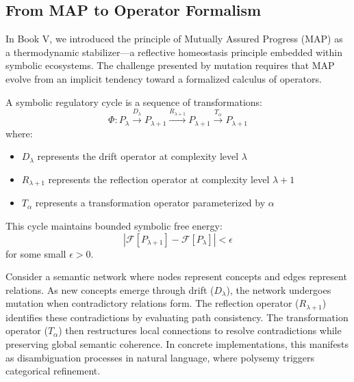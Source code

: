 \subsection{From MAP to Operator Formalism}
\label{subsection:bk6_from_map_to_operator_formalism}
In Book V, we introduced the principle of Mutually Assured Progress (MAP) as a thermodynamic stabilizer—a reflective homeostasis principle embedded within symbolic ecosystems. The challenge presented by mutation requires that MAP evolve from an implicit tendency toward a formalized calculus of operators.
\begin{definition}
\label{definition:bk6_symbolic_regulatory_cycle}
A symbolic regulatory cycle is a sequence of transformations:
\begin{equation}
\Phi: P_{\lambda} \xrightarrow{D_{\lambda}} P_{\lambda+1} \xrightarrow{R_{\lambda+1}} P_{\lambda+1} \xrightarrow{T_{\alpha}} P_{\lambda+1}
\end{equation}
where:
\begin{itemize}
\item $D_{\lambda}$ represents the drift operator at complexity level $\lambda$
\item $R_{\lambda+1}$ represents the reflection operator at complexity level $\lambda+1$
\item $T_{\alpha}$ represents a transformation operator parameterized by $\alpha$
\end{itemize}
This cycle maintains bounded symbolic free energy:
\begin{equation}
|\mathcal{F}[P_{\lambda+1}] - \mathcal{F}[P_{\lambda}]| < \epsilon
\end{equation}
for some small $\epsilon > 0$.
\end{definition}
\begin{scholium}
\label{scholium:bk6_semantic_network_regulation}
Consider a semantic network where nodes represent concepts and edges represent relations. As new concepts emerge through drift ($D_{\lambda}$), the network undergoes mutation when contradictory relations form. The reflection operator ($R_{\lambda+1}$) identifies these contradictions by evaluating path consistency. The transformation operator ($T_{\alpha}$) then restructures local connections to resolve contradictions while preserving global semantic coherence. In concrete implementations, this manifests as disambiguation processes in natural language, where polysemy triggers categorical refinement.
\end{scholium}
